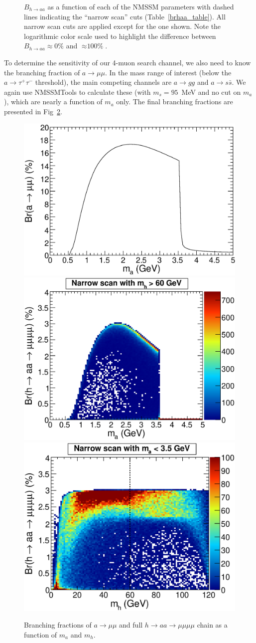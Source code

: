 \documentclass[aps,12pt,superscriptaddress,nofootinbib,floatfix,showpacs]{revtex4}
\begin{document}
\begin{figure}[htb]
\begin{center}
\caption{$B_{h \to aa}$ as a function of each of the NMSSM
  parameters with dashed lines indicating the ``narrow scan'' cuts
  (Table~\ref{brhaa_table}).  All narrow scan cuts are applied except
  for the one shown.  Note the logarithmic color scale used to
  highlight the difference between $B_{h \to aa} \approx
  \mbox{0\%}$ and $\approx \mbox{100\%}$. \label{brhaa_plots}}
\end{center}
\end{figure}

To determine the sensitivity of our 4-muon search channel, we also
need to know the branching fraction of $a\to\mu\mu$.  In the mass
range of interest (below the $a \to \tau^+\tau^-$ threshold), the main
competing channels are $a \to gg$ and $a \to s\bar{s}$.  We again use
NMSSMTools to calculate these (with $m_s = 95$~MeV and no cut on
$m_a$), which are nearly a function of $m_a$ only.  The final
branching fractions are presented in Fig~\ref{brh4mu_plots}.

\begin{figure}
\begin{center}
\includegraphics[width=0.333\linewidth]{plots/branching_fractions_plot.eps}%
\includegraphics[width=0.333\linewidth]{plots/brh4mu_pmass1.eps}%
\includegraphics[width=0.333\linewidth]{plots/brh4mu_smass1.eps}
\caption{Branching fractions of $a \to \mu\mu$ and full $h \to aa \to \mu\mu\mu\mu$ chain
  as a function of $m_a$ and $m_h$. \label{brh4mu_plots}}
\end{center}
\end{figure}
\end{document}
